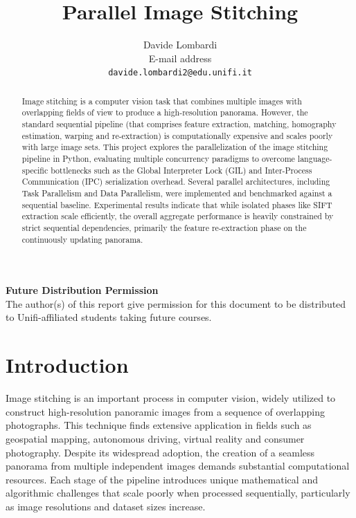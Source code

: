 \documentclass[10pt,twocolumn,letterpaper]{article}
\begin{document}
\title{Parallel Image Stitching}

\author{Davide Lombardi\\
E-mail address\\
{\tt\small davide.lombardi2@edu.unifi.it}
}

\maketitle
\thispagestyle{empty}

\begin{abstract}
Image stitching is a computer vision task that combines multiple 
images with overlapping fields of view to produce a high-resolution panorama. 
However, the standard sequential pipeline (that comprises feature extraction, matching, homography estimation, warping and re-extraction) 
is computationally expensive and scales poorly with large image sets. 
This project explores the parallelization of the image stitching pipeline in Python, 
evaluating multiple concurrency paradigms to overcome language-specific bottlenecks such as 
the Global Interpreter Lock (GIL) and Inter-Process Communication (IPC) serialization overhead. 
Several parallel architectures, including Task Parallelism and Data Parallelism, 
were implemented and benchmarked against a sequential baseline. 
Experimental results indicate that while isolated phases 
 like SIFT extraction scale efficiently, 
 the overall aggregate performance is heavily constrained by strict sequential dependencies, 
 primarily the feature re-extraction phase on the continuously updating panorama. 
\end{abstract}



\noindent\large\textbf{Future Distribution Permission}\\
\indent The author(s) of this report give permission for this document to be distributed to Unifi-affiliated students taking future courses.

\section{Introduction}
Image stitching is an important process in computer vision, widely utilized to construct 
high-resolution panoramic images from a sequence of overlapping photographs. 
This technique finds extensive application in fields such as geospatial mapping, 
autonomous driving, virtual reality and consumer photography. 
Despite its widespread adoption, the creation of a seamless panorama from multiple independent 
images demands substantial computational resources. Each stage of the pipeline introduces 
unique mathematical and algorithmic challenges that scale poorly when processed sequentially, 
particularly as image resolutions and dataset sizes increase.
\end{document}
